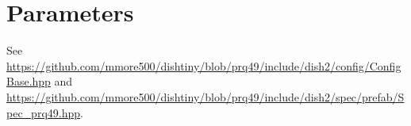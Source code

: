 \section{Parameters}

See \url{https://github.com/mmore500/dishtiny/blob/prq49/include/dish2/config/ConfigBase.hpp} and \url{https://github.com/mmore500/dishtiny/blob/prq49/include/dish2/spec/prefab/Spec_prq49.hpp}.